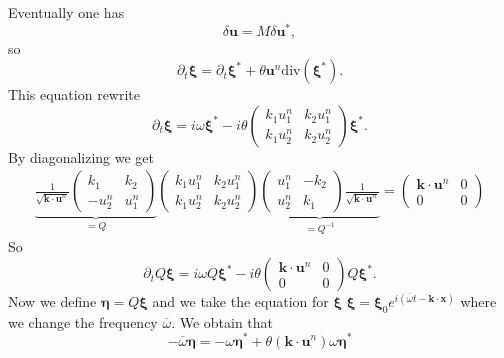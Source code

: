 \documentclass[a4paper, 11pt]{article}
\begin{document}
Eventually one has
\begin{equation*}
\delta \boldsymbol{u}=M\delta \boldsymbol{u}^*,
\end{equation*}
so \begin{equation*}
\partial_t \boldsymbol{\xi}=\partial_t\boldsymbol{\xi}^*+\theta\boldsymbol{u}^n\text{div}(\boldsymbol{\xi}^*). 
\end{equation*}
This equation rewrite
\begin{equation*}
\partial_t \boldsymbol{\xi}=i\omega\boldsymbol{\xi}^*-i\theta\begin{pmatrix}k_1u_1^n&k_2u_1^n\\k_1u_2^n&k_2u_2^n\end{pmatrix}\boldsymbol{\xi}^*.
\end{equation*}
By diagonalizing we get
\begin{equation*}
\begin{split}
\underbrace{\frac{1}{\sqrt{\boldsymbol{k}\cdot \boldsymbol{u}^n}}
\begin{pmatrix}
k_1&k_2\\-u_2^n&u_1^n
\end{pmatrix}}_{=Q}\begin{pmatrix}k_1u_1^n&k_2u_1^n\\k_1u_2^n&k_2u_2^n\end{pmatrix}\underbrace{\begin{pmatrix}u_1^n&-k_2\\u_2^n&k_1\end{pmatrix}\frac{1}{\sqrt{\boldsymbol{k}\cdot \boldsymbol{u}^n}}}_{=Q^{-1}}=\begin{pmatrix}\boldsymbol{k}\cdot \boldsymbol{u}^n&0\\0&0\end{pmatrix}
\end{split}
\end{equation*}
So \begin{equation*}
\partial_t Q\boldsymbol{\xi}=i\omega Q\boldsymbol{\xi}^*-i\theta\begin{pmatrix}\boldsymbol{k}\cdot \boldsymbol{u}^n&0\\0&0\end{pmatrix}Q\boldsymbol{\xi}^*.
\end{equation*}
Now we define $\boldsymbol{\eta}=Q\boldsymbol{\xi}$  and we take the equation for $\boldsymbol{\xi}$ $\boldsymbol{\xi}=\boldsymbol{\xi}_0e^{i(\overline{\omega} t-\boldsymbol{k}\cdot \boldsymbol{x})}$ where we change the frequency $\overline{\omega}$. We obtain that
\begin{equation*}
- \overline{\omega} \boldsymbol{\eta}=- \omega\boldsymbol{\eta}^*+\theta(\boldsymbol{k}\cdot \boldsymbol{u}^n) \omega \boldsymbol{\eta}^*\end{equation*}
\end{document}
